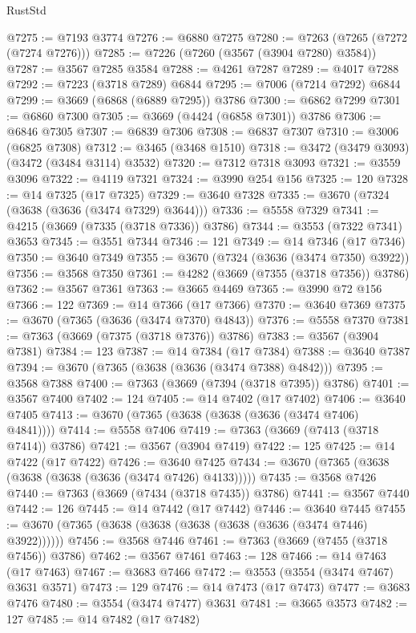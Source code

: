 \begin{lexlean}{RustStd}
\begin{coremodule}
@7275 := @7193 @3774
@7276 := @6880 @7275
@7280 := @7263 (@7265 (@7272 (@7274 @7276)))
@7285 := @7226 (@7260 (@3567 (@3904 @7280) @3584))
@7287 := @3567 @7285 @3584
@7288 := @4261 @7287
@7289 := @4017 @7288
@7292 := @7223 (@3718 @7289) @6844
@7295 := @7006 (@7214 @7292) @6844
@7299 := @3669 (@6868 (@6889 @7295)) @3786
@7300 := @6862 @7299
@7301 := @6860 @7300
@7305 := @3669 (@4424 (@6858 @7301)) @3786
@7306 := @6846 @7305
@7307 := @6839 @7306
@7308 := @6837 @7307
@7310 := @3006 (@6825 @7308)
@7312 := @3465 (@3468 @1510)
@7318 := @3472 (@3479 @3093) (@3472 (@3484 @3114) @3532)
@7320 := @7312 @7318 @3093
@7321 := @3559 @3096
@7322 := @4119 @7321
@7324 := @3990 @254 @156
@7325 := 120
@7328 := @14 @7325 (@17 @7325)
@7329 := @3640 @7328
@7335 := @3670 (@7324 (@3638 (@3636 (@3474 @7329) @3644)))
@7336 := @5558 @7329
@7341 := @4215 (@3669 (@7335 (@3718 @7336)) @3786)
@7344 := @3553 (@7322 @7341) @3653
@7345 := @3551 @7344
@7346 := 121
@7349 := @14 @7346 (@17 @7346)
@7350 := @3640 @7349
@7355 := @3670 (@7324 (@3636 (@3474 @7350) @3922))
@7356 := @3568 @7350
@7361 := @4282 (@3669 (@7355 (@3718 @7356)) @3786)
@7362 := @3567 @7361
@7363 := @3665 @4469
@7365 := @3990 @72 @156
@7366 := 122
@7369 := @14 @7366 (@17 @7366)
@7370 := @3640 @7369
@7375 := @3670 (@7365 (@3636 (@3474 @7370) @4843))
@7376 := @5558 @7370
@7381 := @7363 (@3669 (@7375 (@3718 @7376)) @3786)
@7383 := @3567 (@3904 @7381)
@7384 := 123
@7387 := @14 @7384 (@17 @7384)
@7388 := @3640 @7387
@7394 := @3670 (@7365 (@3638 (@3636 (@3474 @7388) @4842)))
@7395 := @3568 @7388
@7400 := @7363 (@3669 (@7394 (@3718 @7395)) @3786)
@7401 := @3567 @7400
@7402 := 124
@7405 := @14 @7402 (@17 @7402)
@7406 := @3640 @7405
@7413 := @3670 (@7365 (@3638 (@3638 (@3636 (@3474 @7406) @4841))))
@7414 := @5558 @7406
@7419 := @7363 (@3669 (@7413 (@3718 @7414)) @3786)
@7421 := @3567 (@3904 @7419)
@7422 := 125
@7425 := @14 @7422 (@17 @7422)
@7426 := @3640 @7425
@7434 := @3670 (@7365 (@3638 (@3638 (@3638 (@3636 (@3474 @7426) @4133)))))
@7435 := @3568 @7426
@7440 := @7363 (@3669 (@7434 (@3718 @7435)) @3786)
@7441 := @3567 @7440
@7442 := 126
@7445 := @14 @7442 (@17 @7442)
@7446 := @3640 @7445
@7455 := @3670 (@7365 (@3638 (@3638 (@3638 (@3638 (@3636 (@3474 @7446) @3922))))))
@7456 := @3568 @7446
@7461 := @7363 (@3669 (@7455 (@3718 @7456)) @3786)
@7462 := @3567 @7461
@7463 := 128
@7466 := @14 @7463 (@17 @7463)
@7467 := @3683 @7466
@7472 := @3553 (@3554 (@3474 @7467) @3631 @3571)
@7473 := 129
@7476 := @14 @7473 (@17 @7473)
@7477 := @3683 @7476
@7480 := @3554 (@3474 @7477) @3631
@7481 := @3665 @3573
@7482 := 127
@7485 := @14 @7482 (@17 @7482)

\end{coremodule}
\end{lexlean}
